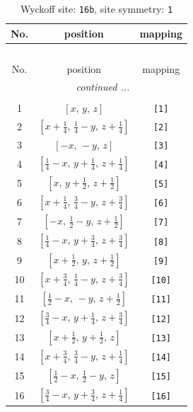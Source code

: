 \documentclass[fleqn,8pt]{jsarticle}
\begin{document}
\begin{longtable}{ccc}
\caption{Wyckoff site: {\tt 16b}, site symmetry: {\tt 1}}
 \\
 \hline \hline
No. & position & mapping \\ \hline \endfirsthead

\multicolumn{2}{l}{\tablename\ \thetable{}} \\
 \hline \hline
No. & position & mapping \\ \hline \endhead

 \hline \hline
\multicolumn{2}{r}{\footnotesize\it continued ...} \\ \endfoot

 \hline \hline
\multicolumn{2}{r}{} \\ \endlastfoot

1 & $\left[ x,\, y,\, z \right]$ & {\tt [1]} \\ \hline
2 & $\left[ x + \frac{1}{4},\, \frac{1}{4} - y,\, z + \frac{1}{4} \right]$ & {\tt [2]} \\ \hline
3 & $\left[ - x,\, - y,\, z \right]$ & {\tt [3]} \\ \hline
4 & $\left[ \frac{1}{4} - x,\, y + \frac{1}{4},\, z + \frac{1}{4} \right]$ & {\tt [4]} \\ \hline
5 & $\left[ x,\, y + \frac{1}{2},\, z + \frac{1}{2} \right]$ & {\tt [5]} \\ \hline
6 & $\left[ x + \frac{1}{4},\, \frac{3}{4} - y,\, z + \frac{3}{4} \right]$ & {\tt [6]} \\ \hline
7 & $\left[ - x,\, \frac{1}{2} - y,\, z + \frac{1}{2} \right]$ & {\tt [7]} \\ \hline
8 & $\left[ \frac{1}{4} - x,\, y + \frac{3}{4},\, z + \frac{3}{4} \right]$ & {\tt [8]} \\ \hline
9 & $\left[ x + \frac{1}{2},\, y,\, z + \frac{1}{2} \right]$ & {\tt [9]} \\ \hline
10 & $\left[ x + \frac{3}{4},\, \frac{1}{4} - y,\, z + \frac{3}{4} \right]$ & {\tt [10]} \\ \hline
11 & $\left[ \frac{1}{2} - x,\, - y,\, z + \frac{1}{2} \right]$ & {\tt [11]} \\ \hline
12 & $\left[ \frac{3}{4} - x,\, y + \frac{1}{4},\, z + \frac{3}{4} \right]$ & {\tt [12]} \\ \hline
13 & $\left[ x + \frac{1}{2},\, y + \frac{1}{2},\, z \right]$ & {\tt [13]} \\ \hline
14 & $\left[ x + \frac{3}{4},\, \frac{3}{4} - y,\, z + \frac{1}{4} \right]$ & {\tt [14]} \\ \hline
15 & $\left[ \frac{1}{2} - x,\, \frac{1}{2} - y,\, z \right]$ & {\tt [15]} \\ \hline
16 & $\left[ \frac{3}{4} - x,\, y + \frac{3}{4},\, z + \frac{1}{4} \right]$ & {\tt [16]} \\
\end{longtable}
\end{document}
